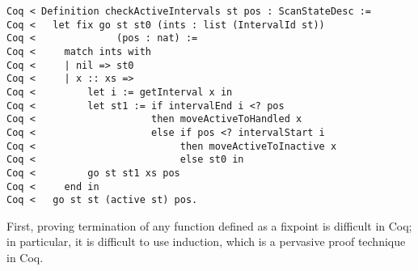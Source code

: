 \documentclass{llncs}
\begin{document}
\begin{flushleft}
\texttt{Coq~{<}~Definition~checkActiveIntervals~st~pos~:~ScanStateDesc~:=}\\
\texttt{Coq~{<}~~~let~fix~go~st~st0~(ints~:~list~(IntervalId~st))}\\
\texttt{Coq~{<}~~~~~~~~~~~~~~(pos~:~nat)~:=}\\
\texttt{Coq~{<}~~~~~match~ints~with}\\
\texttt{Coq~{<}~~~~~|~nil~={>}~st0}\\
\texttt{Coq~{<}~~~~~|~x~::~xs~={>}}\\
\texttt{Coq~{<}~~~~~~~~~let~i~:=~getInterval~x~in}\\
\texttt{Coq~{<}~~~~~~~~~let~st1~:=~if~intervalEnd~i~{<}?~pos}\\
\texttt{Coq~{<}~~~~~~~~~~~~~~~~~~~~then~moveActiveToHandled~x}\\
\texttt{Coq~{<}~~~~~~~~~~~~~~~~~~~~else~if~pos~{<}?~intervalStart~i}\\
\texttt{Coq~{<}~~~~~~~~~~~~~~~~~~~~~~~~~then~moveActiveToInactive~x}\\
\texttt{Coq~{<}~~~~~~~~~~~~~~~~~~~~~~~~~else~st0~in}\\
\texttt{Coq~{<}~~~~~~~~~go~st~st1~xs~pos}\\
\texttt{Coq~{<}~~~~~end~in}\\
\texttt{Coq~{<}~~~go~st~st~(active~st)~pos.}\\
\end{flushleft}




First, proving termination of any function defined as a fixpoint is
difficult in Coq; in particular, it is difficult to use induction,
which is a pervasive proof technique in Coq.
\end{document}

